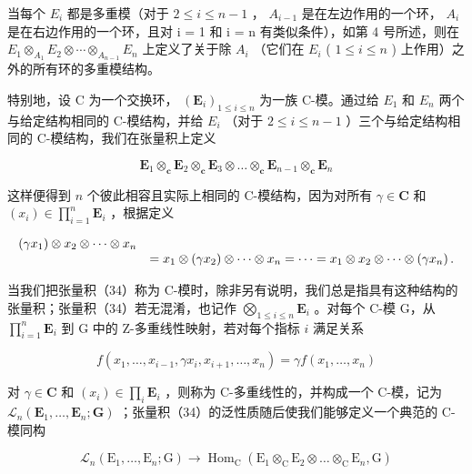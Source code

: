 当每个 \(E_{i}\) 都是多重模（对于 \(2 \leqslant i \leqslant n - 1\) ， \(A_{i-1}\) 是在左边作用的一个环， \(A_{i}\) 是在右边作用的一个环，且对 i = 1 和 i = n 有类似条件），如第 4 号所述，则在 \(E_{1} \otimes_{A_1} E_{2} \otimes \cdots \otimes_{A_{n-1}} E_{n}\) 上定义了关于除 \(A_{i}\) （它们在 \(E_{i}\) ( \(1 \leqslant i \leqslant n\) ) 上作用）之外的所有环的多重模结构。

特别地，设 C 为一个交换环， \((\mathbf{E}_{i})_{1\leqslant i\leqslant n}\) 为一族 C-模。通过给 \(E_{1}\) 和 \(E_{n}\) 两个与给定结构相同的 C-模结构，并给 \(E_{i}\) （对于 \(2\leqslant i\leqslant n-1\) ）三个与给定结构相同的 C-模结构，我们在张量积上定义

\[
\mathbf {E} _ {1} \otimes_ {\mathbf {c}} \mathbf {E} _ {2} \otimes_ {\mathbf {c}} \mathbf {E} _ {3} \otimes \dots \otimes_ {\mathbf {c}} \mathbf {E} _ {n - 1} \otimes_ {\mathbf {c}} \mathbf {E} _ {n}\tag{34}
\]

这样便得到 \(n\) 个彼此相容且实际上相同的 C-模结构，因为对所有 \(\gamma \in \mathbf{C}\) 和 \((x_{i})\in \prod_{i = 1}^{n}\mathbf{E}_{i}\) ，根据定义

\[
\begin{array}{r l} \left(\gamma x _ {1}\right) \otimes x _ {2} \otimes \dots \otimes x _ {n} \\ & = x _ {1} \otimes \left(\gamma x _ {2}\right) \otimes \dots \otimes x _ {n} = \dots = x _ {1} \otimes x _ {2} \otimes \dots \otimes \left(\gamma x _ {n}\right). \end{array}
\]

当我们把张量积（34）称为 C-模时，除非另有说明，我们总是指具有这种结构的张量积；张量积（34）若无混淆，也记作 \(\bigotimes_{1\leqslant i\leqslant n}\mathbf{E}_i\) 。对每个 C-模 G，从 \(\prod_{i=1}^{n}\mathbf{E}_i\) 到 G 中的 Z-多重线性映射，若对每个指标 \(i\) 满足关系

\[
f (x _ {1}, \dots , x _ {i - 1}, \gamma x _ {i}, x _ {i + 1}, \dots , x _ {n}) = \gamma f (x _ {1}, \dots , x _ {n})\tag{35}
\]

对 \(\gamma \in \mathbf{C}\) 和 \((x_{i})\in \prod_{i}\mathbf{E}_{i}\) ，则称为 C-多重线性的，并构成一个 C-模，记为 \(\mathcal{L}_n(\mathbf{E}_1,\dots ,\mathbf{E}_n;\mathbf{G})\) ；张量积（34）的泛性质随后使我们能够定义一个典范的 C-模同构

\[
\mathcal {L} _ {n} \left(\mathrm{E} _ {1}, \dots , \mathrm{E} _ {n}; \mathrm{G}\right)\rightarrow \operatorname{Hom} _ {\mathrm{C}} \left(\mathrm{E} _ {1} \otimes_ {\mathrm{C}} \mathrm{E} _ {2} \otimes \dots \otimes_ {\mathrm{C}} \mathrm{E} _ {n}, \mathrm{G}\right)\tag{36}
\]

